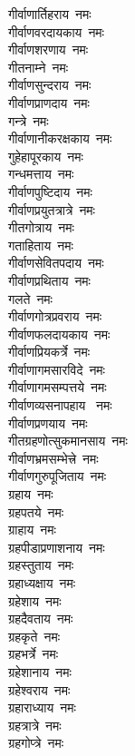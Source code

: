 \begin{multicols}{2}
\begin{flushleft}
गीर्वाणार्तिहराय~नमः\\
गीर्वाणवरदायकाय~नमः\\
गीर्वाणशरणाय~नमः\\
गीतनाम्ने~नमः\\
गीर्वाणसुन्दराय~नमः\\
गीर्वाणप्राणदाय~नमः\\
गन्त्रे~नमः\\
गीर्वाणानीकरक्षकाय~नमः\\
गुहेहापूरकाय~नमः\hfill{}\\
गन्धमत्ताय~नमः\\
गीर्वाणपुष्टिदाय~नमः\\
गीर्वाणप्रयुतत्रात्रे~नमः\\
गीतगोत्राय~नमः\\
गताहिताय~नमः\\
गीर्वाणसेवितपदाय~नमः\\
गीर्वाणप्रथिताय~नमः\\
गलते~नमः\\
गीर्वाणगोत्रप्रवराय~नमः\\
गीर्वाणफलदायकाय~नमः\hfill{}\\
गीर्वाणप्रियकर्त्रे~नमः\\
गीर्वाणागमसारविदे~नमः\\
गीर्वाणागमसम्पत्तये~नमः\\
गीर्वाणव्यसनापहाय ~नमः\\
गीर्वाणप्रणयाय~नमः\\
गीतग्रहणोत्सुकमानसाय~नमः\\
गीर्वाणभ्रमसम्भेत्त्रे~नमः\\
गीर्वाणगुरुपूजिताय~नमः\\
ग्रहाय~नमः\\
ग्रहपतये~नमः\hfill{}\\
ग्राहाय~नमः\\
ग्रहपीडाप्रणाशनाय~नमः\\
ग्रहस्तुताय~नमः\\
ग्रहाध्यक्षाय~नमः\\
ग्रहेशाय~नमः\\
ग्रहदैवताय~नमः\\
ग्रहकृते~नमः\\
ग्रहभर्त्रे~नमः\\
ग्रहेशानाय~नमः\\
ग्रहेश्वराय~नमः\hfill{}\\
ग्रहाराध्याय~नमः\\
ग्रहत्रात्रे~नमः\\
ग्रहगोप्त्रे~नमः\\

\end{flushleft}
\end{multicols}
